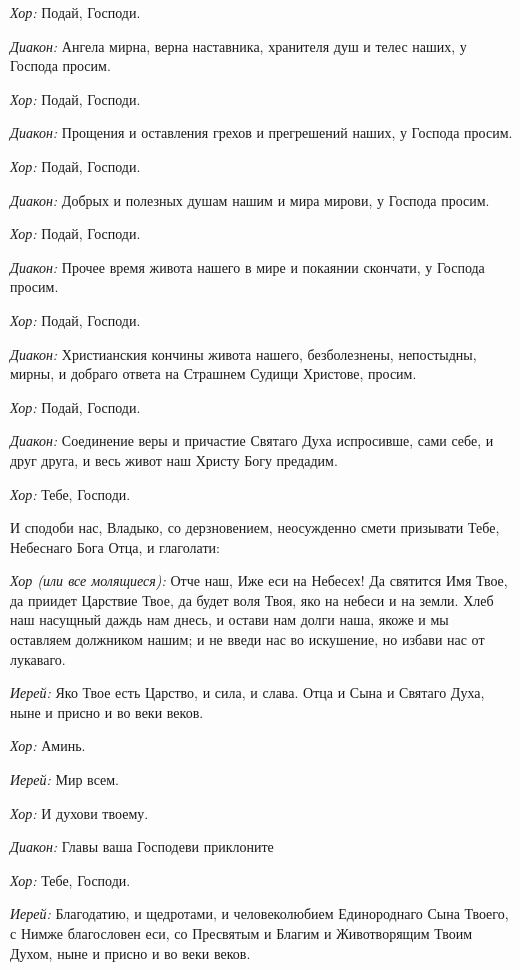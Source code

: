 \begin{mymulticols}
{\itshape Хор:} Подай, Господи.

{\itshape Диакон:} Ангела мирна, верна наставника, хранителя душ и телес наших, у Господа просим. 

{\itshape Хор:} Подай, Господи.

{\itshape Диакон:} Прощения и оставления грехов и прегрешений наших, у Господа просим. 

{\itshape Хор:} Подай, Господи.

{\itshape Диакон:} Добрых и полезных душам нашим и мира мирови, у Господа просим. 

{\itshape Хор:} Подай, Господи.

{\itshape Диакон:} Прочее время живота нашего в мире и покаянии скончати, у Господа просим. 

{\itshape Хор:} Подай, Господи.

{\itshape Диакон:} Христианския кончины живота нашего, безболезнены, непостыдны, мирны, и добраго ответа на Страшнем Судищи Христове, просим. 

{\itshape Хор:} Подай, Господи.

{\itshape Диакон:} Соединение веры и причастие Святаго Духа испросивше, сами себе, и друг друга, и весь живот наш Христу Богу предадим. 

{\itshape Хор:} Тебе, Господи. 

И сподоби нас, Владыко, со дерзновением, неосужденно смети призывати Тебе, Небеснаго Бога Отца, и глаголати: 


{\itshape Хор (или все молящиеся):} Отче наш, Иже еси на Небесех! Да святится Имя Твое, да приидет Царствие Твое, да будет воля Твоя, яко на небеси и на земли. Хлеб наш насущный даждь нам днесь, и остави нам долги наша, якоже и мы оставляем должником нашим; и не введи нас во искушение, но избави нас от лукаваго. 

{\itshape Иерей:} Яко Твое есть Царство, и сила, и слава. Отца и Сына и Святаго Духа, ныне и присно и во веки веков. 

{\itshape Хор:} Аминь. 

{\itshape Иерей:} Мир всем. 

{\itshape Хор:} И духови твоему.

{\itshape Диакон:} Главы ваша Господеви приклоните

{\itshape Хор:} Тебе, Господи.

{\itshape Иерей:} Благодатию, и щедротами, и человеколюбием Единороднаго Сына Твоего, с Нимже благословен еси, со Пресвятым и Благим и Животворящим Твоим Духом, ныне и присно и во веки веков. 


\end{mymulticols}

